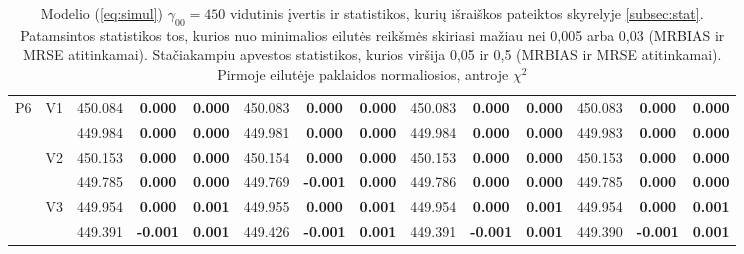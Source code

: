\documentclass[11pt,a4paper]{article}
\begin{document}
{\begin{sidewaystable}[H]
{\begin{tabular}{cc|ccc|ccc|ccc|ccc|}
   \hline \hline\multirow{6}{*}{P6} & \multirow{2}{*}{V1} & 450.084 & \textbf{0.000} & \textbf{0.000} & 450.083 & \textbf{0.000} & \textbf{0.000} & 450.083 & \textbf{0.000} & \textbf{0.000} & 450.083 & \textbf{0.000} & \textbf{0.000} \\ 
   &  & 449.984 & \textbf{0.000} & \textbf{0.000} & 449.981 & \textbf{0.000} & \textbf{0.000} & 449.984 & \textbf{0.000} & \textbf{0.000} & 449.983 & \textbf{0.000} & \textbf{0.000} \\ 
   & \multirow{2}{*}{V2} & 450.153 & \textbf{0.000} & \textbf{0.000} & 450.154 & \textbf{0.000} & \textbf{0.000} & 450.153 & \textbf{0.000} & \textbf{0.000} & 450.153 & \textbf{0.000} & \textbf{0.000} \\ 
   &  & 449.785 & \textbf{0.000} & \textbf{0.000} & 449.769 & \textbf{-0.001} & \textbf{0.000} & 449.786 & \textbf{0.000} & \textbf{0.000} & 449.785 & \textbf{0.000} & \textbf{0.000} \\ 
   & \multirow{2}{*}{V3} & 449.954 & \textbf{0.000} & \textbf{0.001} & 449.955 & \textbf{0.000} & \textbf{0.001} & 449.954 & \textbf{0.000} & \textbf{0.001} & 449.954 & \textbf{0.000} & \textbf{0.001} \\ 
   &  & 449.391 & \textbf{-0.001} & \textbf{0.001} & 449.426 & \textbf{-0.001} & \textbf{0.001} & 449.391 & \textbf{-0.001} & \textbf{0.001} & 449.390 & \textbf{-0.001} & \textbf{0.001} \\ 
   \hline
\end{tabular}%
}
\caption[Modelio (\ref{eq:simul}) $\gamma_{00}=450$ vidutinis įvertis ir statistikos]{Modelio (\ref{eq:simul}) $\gamma_{00}=450$ vidutinis įvertis ir statistikos, kurių išraiškos pateiktos skyrelyje \ref{subsec:stat}. Patamsintos statistikos tos, kurios nuo minimalios eilutės reikšmės skiriasi mažiau nei 0,005 arba 0,03 (MRBIAS ir MRSE atitinkamai). Stačiakampiu apvestos statistikos, kurios viršija 0,05 ir 0,5 (MRBIAS ir MRSE atitinkamai). Pirmoje eilutėje paklaidos normaliosios, antroje $\chi^2$}
\end{sidewaystable}
}
\end{document}
